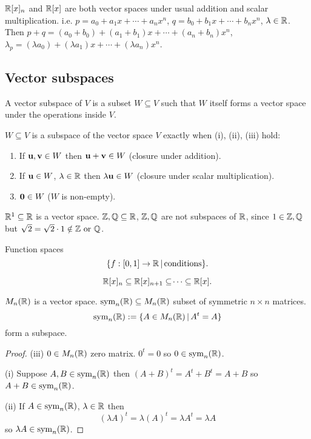 \documentclass[10pt, a4paper]{article}
\begin{document}
$\mathbb{R}[x]_n$ and $\mathbb{R}[x]$ are both vector spaces under usual addition and scalar multiplication.
i.e. $p = a_0 + a_1x + \dotsi + a_nx ^ n$, $q = b_0 + b_1x + \dotsi + b_nx ^ n$, $\lambda \in \mathbb{R}$.
Then $p + q = (a_0 + b_0) + (a_1 + b_1)x + \dotsi + (a_n + b_n)x ^ n$,
$\lambda_p = (\lambda a_0) + (\lambda a_1)x + \dotsi + (\lambda a_n)x ^ n$.

\subsection{Vector subspaces}
\begin{definition}
    A vector subspace of $V$ is a subset $W \subseteq V$ such that $W$ itself forms a vector space under the operations inside $V$.
\end{definition}

\begin{lemma}
    $W \subseteq V$ is a subspace of the vector space $V$ exactly when (i), (ii), (iii) hold:
    \begin{enumerate}[label = (\roman*)]
        \item If $\mathbf{u, v} \in W$ then $\mathbf{u + v} \in W$
        (closure under addition).
        \item If $\mathbf{u} \in W$, $\lambda \in \mathbb{R}$ then $\lambda\mathbf{u} \in W$
        (closure under scalar multiplication).
        \item $\mathbf{0} \in W$
        ($W$ is non-empty).
    \end{enumerate}
\end{lemma}

$\mathbb{R} ^ 1 \subseteq \mathbb{R}$ is a vector space. $\mathbb{Z}, \mathbb{Q} \subseteq \mathbb{R}$,
$\mathbb{Z}, \mathbb{Q}$ are not subspaces of $\mathbb{R}$,
since $1 \in \mathbb{Z}, \mathbb{Q}$ but $\sqrt{2} = \sqrt{2} \cdot 1 \notin \mathbb{Z} \text{ or } \mathbb{Q}$.

\begin{example}
    Function spaces
    \[
    \{f : [0, 1] \rightarrow \mathbb{R}\,|\,\text{conditions}\}.
    \]
\end{example}
\begin{example}
    \[
    \mathbb{R}[x]_n \subseteq \mathbb{R}[x]_{n + 1} \subseteq \dotsi \subseteq \mathbb{R}[x].
    \]
\end{example}

\begin{example}
    $M_n(\mathbb{R})$ is a vector space.
    $\mathrm{sym}_n(\mathbb{R}) \subseteq M_n(\mathbb{R})$ subset of symmetric $n \times n$ matrices.
    \[
    \mathrm{sym}_n(\mathbb{R}) := \{A \in M_n(\mathbb{R})\,|\, A ^ t = A\}
    \]
    form a subspace.
    \begin{proof}
        (iii) $0 \in M_n(\mathbb{R})$ zero matrix.
        $0 ^ t = 0$ so $0 \in \mathrm{sym}_n(\mathbb{R})$.

        (i) Suppose $A, B \in \mathrm{sym}_n(\mathbb{R})$ then $(A + B) ^ t = A ^ t + B ^ t = A + B$ so $A + B \in \mathrm{sym}_n(\mathbb{R})$.

        (ii) If $A \in \mathrm{sym}_n(\mathbb{R})$,
        $\lambda \in \mathbb{R}$ then
        \[
        (\lambda A) ^ t = \lambda(A) ^ t = \lambda A ^ t = \lambda A
        \]
        so $\lambda A \in \mathrm{sym}_n(\mathbb{R})$.
        \end{proof}
\end{example}
\end{document}
